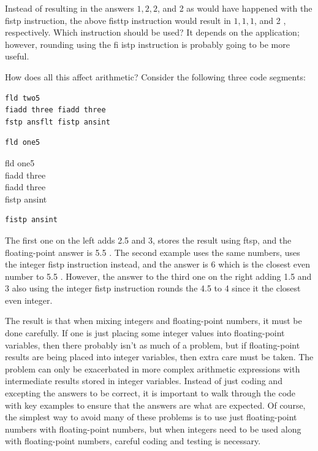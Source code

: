 \documentclass[10pt]{book}
\begin{document}
Instead of resulting in the answers $1,2,2$, and 2 as would have happened with the fistp instruction, the above fisttp instruction would result in $1,1,1$, and 2 , respectively. Which instruction should be used? It depends on the application; however, rounding using the fi istp instruction is probably going to be more useful.

How does all this affect arithmetic? Consider the following three code segments:

\begin{verbatim}
fld two5
fiadd three fiadd three
fstp ansflt fistp ansint
\end{verbatim}

\begin{verbatim}
fld one5
\end{verbatim}

fld one5\\
fiadd three\\
fiadd three\\
fistp ansint

\begin{verbatim}
fistp ansint
\end{verbatim}

The first one on the left adds 2.5 and 3, stores the result using ftsp, and the floating-point answer is 5.5 . The second example uses the same numbers, uses the integer fistp instruction instead, and the answer is 6 which is the closest even number to 5.5 . However, the answer to the third one on the right adding 1.5 and 3 also using the integer fistp instruction rounds the 4.5 to 4 since it the closest even integer.

The result is that when mixing integers and floating-point numbers, it must be done carefully. If one is just placing some integer values into floating-point variables, then there probably isn't as much of a problem, but if floating-point results are being placed into integer variables, then extra care must be taken. The problem can only be exacerbated in more complex arithmetic expressions with intermediate results stored in integer variables. Instead of just coding and excepting the answers to be correct, it is important to walk through the code with key examples to ensure that the answers are what are expected. Of course, the simplest way to avoid many of these problems is to use just floating-point numbers with floating-point numbers, but when integers need to be used along with floating-point numbers, careful coding and testing is necessary.
\end{document}
